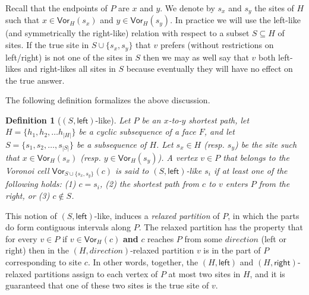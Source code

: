 \documentclass{article}
\newcommand{\leftside}{\mathsf{left}}
\newcommand{\rightside}{\mathsf{right}}
\newcommand{\Vor}{\textsf{Vor}}
\newtheorem{definition}{Definition}
\begin{document}
Recall that the endpoints of $P$ are $x$ and $y$.
We denote by $s_x$ and $s_y$ the sites of $H$ such that $x\in \Vor_H(s_x)$  and $y\in\Vor_H(s_y)$.
In practice we will use the left-like (and symmetrically the right-like) relation with respect to a subset $S \subseteq H$ of sites.
If the true site in $S\cup\{s_x,s_y\}$ that $v$ prefers (without restrictions on left/right) is not one of the sites in $S$ then we may as well say that $v$ both left-likes and right-likes all sites in $S$ because eventually they will have no effect on the true answer.










The following definition formalizes the above discussion.
\begin{definition}[$(S,\leftside)$-like]
Let $P$ be an  $x$-to-$y$ shortest path, let
$H=\{h_1,h_2,\ldots h_{|H|}\}$ be a cyclic subsequence of a face $F$, and let $S=\{s_1,s_2,\ldots, s_{|S|}\}$ be a subsequence of $H$.
Let $s_x\in H$ (resp. $s_y$) be the site such that $x\in\Vor_H(s_x)$ (resp. $y\in \Vor_H(s_y)$).
A vertex $v\in P$ that belongs to the Voronoi cell $\Vor_{S\cup \{s_x,s_y\}}(c)$ is said to $(S,\leftside)$-like $s_i$ if at least one of the following holds: (1) $c=s_i$,
    (2) the shortest path from $c$ to $v$ enters $P$ from the right, or (3)  $c\notin S$.
\end{definition}

This notion of $(S,\leftside)$-like,  induces a {\em  relaxed partition} of $P$, in which the parts do form contiguous intervals along $P$.
 The relaxed partition has the property that for every $v\in P$  if $v\in \Vor_H(c)$ \textbf{and} $c$ reaches $P$ from some $direction$ (left or right) then in the $(H,direction)$-relaxed partition $v$ is in the part of $P$ corresponding to site $c$.
 In other words, together, the $(H,\leftside)$ and $(H,\rightside)$-relaxed partitions assign to each vertex of $P$ at most two sites in $H$, and it is guaranteed that one of these two sites is the true site of $v$.
\end{document}
